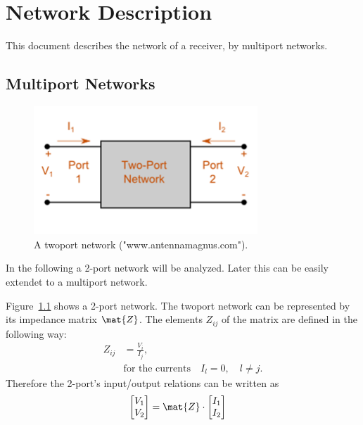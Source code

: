 \chapter{Network Description}
\label{sec:network_description}
This document describes the network of a receiver, by multiport networks.

\section{Multiport Networks}
\label{sec:multiport_networks}
\begin{figure}
\begin{center}
\includegraphics[width=0.75\textwidth]{images/twoport.png}
\caption{A twoport network ("www.antennamagnus.com").}
\label{fig:twoport}
\end{center}
\end{figure}
In the following a 2-port network will be analyzed.
Later this can be easily extendet to a multiport network.

Figure~\ref{fig:twoport} shows a 2-port network.
The twoport network can be represented by its impedance matrix $\mat{Z}$.
The elements $Z_{ij}$ of the matrix are defined in the following way:
\begin{align}
\label{eq:multiport_impedance}
Z_{ij} &= \frac{V_i}{I_j},\\\nonumber
&\text{for the currents}\quad I_l = 0,\quad l\neq j.
\end{align}
Therefore the 2-port's input/output relations can be written as
\begin{align}
\label{eq:twoport_io}
\begin{bmatrix}
V_1\\V_2
\end{bmatrix} &= \mat{Z} \cdot
\begin{bmatrix}
I_1\\I_2
\end{bmatrix}
\end{align}

